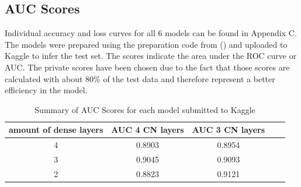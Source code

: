 \subsection{AUC Scores}
Individual accuracy and loss curves for all 6 models can be found in Appendix C. The models were prepared using the preparation code from (\cite{Veto8p361-project-imaging}) and uploaded to Kaggle to infer the test set. The scores indicate the area under the ROC curve or AUC. The private scores have been chosen due to the fact that those scores are calculated with about 80\% of the test data and therefore represent a better efficiency in the model.
\begin{table}[h]
\centering
\begin{tabular}[width=0.7\textwidth]{|c|c|c|c|c|}
\hline
\textbf{amount of dense layers} & \textbf{AUC 4 CN layers} & \textbf{AUC 3 CN layers} \\ \hline
4 & 0.8903 & 0.8954\\ \hline
3 & 0.9045 & 0.9093 \\ \hline
2 & 0.8823 & 0.9121\\ \hline
\end{tabular}
\caption{Summary of AUC Scores for each model submitted to Kaggle}
\label{AUC table}
\end{table}

